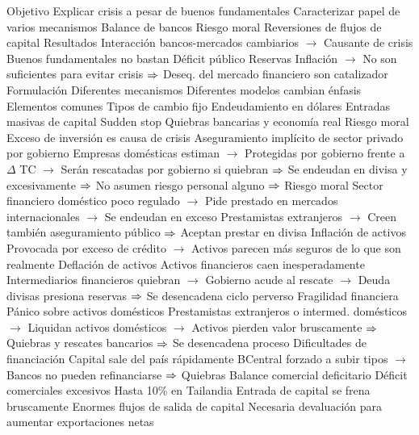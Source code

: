 \documentclass{nuevotema}
\begin{document}
\begin{esquemal}
			\3 Objetivo
				\4 Explicar crisis a pesar de buenos fundamentales
				\4 Caracterizar papel de varios mecanismos
				\4[] Balance de bancos
				\4[] Riesgo moral
				\4[] Reversiones de flujos de capital
			\3 Resultados
				\4 Interacción bancos-mercados cambiarios
				\4[] $\to$ Causante de crisis
				\4 Buenos fundamentales no bastan
				\4[] Déficit público
				\4[] Reservas
				\4[] Inflación
				\4[] $\to$ No son suficientes para evitar crisis
				\4[] $\Rightarrow$ Deseq. del mercado financiero son catalizador
		\2 Formulación
			\3 Diferentes mecanismos
				\4 Diferentes modelos cambian énfasis
				\4 Elementos comunes
				\4[] Tipos de cambio fijo
				\4[] Endeudamiento en dólares
				\4[] Entradas masivas de capital
				\4[] Sudden stop
				\4[] Quiebras bancarias y economía real
			\3 Riesgo moral
				\4 Exceso de inversión es causa de crisis
				\4 Aseguramiento implícito de sector privado por gobierno
				\4[] Empresas domésticas estiman
				\4[] $\to$ Protegidas por gobierno frente a $\Delta$ TC
				\4[] $\to$ Serán rescatadas por gobierno si quiebran
				\4[] $\Rightarrow$ Se endeudan en divisa y excesivamente
				\4[] $\Rightarrow$ No asumen riesgo personal alguno
				\4[] $\Rightarrow$ Riesgo moral
				\4[] Sector financiero doméstico poco regulado
				\4[] $\to$ Pide prestado en mercados internacionales
				\4[] $\to$ Se endeudan en exceso
				\4[] Prestamistas extranjeros
				\4[] $\to$ Creen también aseguramiento público
				\4[] $\Rightarrow$ Aceptan prestar en divisa
				\4 Inflación de activos
				\4[] Provocada por exceso de crédito
				\4[] $\to$ Activos parecen más seguros de lo que son realmente
				\4 Deflación de activos
				\4[] Activos financieros caen inesperadamente
				\4[] Intermediarios financieros quiebran
				\4[] $\to$ Gobierno acude al rescate
				\4[] $\to$ Deuda divisas presiona reservas
				\4[] $\Rightarrow$ Se desencadena ciclo perverso
			\3 Fragilidad financiera
				\4 Pánico sobre activos domésticos
				\4[] Prestamistas extranjeros o intermed. domésticos
				\4[] $\to$ Liquidan activos domésticos
				\4[] $\to$ Activos pierden valor bruscamente
				\4[] $\Rightarrow$ Quiebras y rescates bancarios
				\4[] $\Rightarrow$ Se desencadena proceso
				\4 Dificultades de financiación
				\4[] Capital sale del país rápidamente
				\4[] BCentral forzado a subir tipos
				\4[] $\to$ Bancos no pueden refinanciarse
				\4[] $\Rightarrow$ Quiebras
			\3 Balance comercial deficitario
				\4 Déficit comerciales excesivos
				\4[] Hasta 10\% en Tailandia
				\4 Entrada de capital se frena bruscamente
				\4[] Enormes flujos de salida de capital
				\4 Necesaria devaluación para aumentar exportaciones netas

\end{esquemal}
\end{document}
